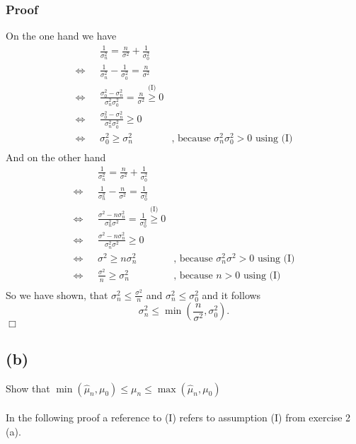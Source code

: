 \documentclass{article}
\begin{document}
\subsubsection*{Proof}
On the one hand we have
\begin{align*}
				   &\frac{1}{\sigma^2_n} = \frac{n}{\sigma^2} + \frac{1}{\sigma^2_0}&\\
\Leftrightarrow ~~~&\frac{1}{\sigma^2_n} - \frac{1}{\sigma^2_0} = \frac{n}{\sigma^2}&\\
\Leftrightarrow ~~~&\frac{\sigma^2_0 - \sigma^2_n}{\sigma^2_n\sigma^2_0} = \frac{n}{\sigma^2} \stackrel{\text{(I)}}{\geq} 0&\\
\Leftrightarrow ~~~&\frac{\sigma^2_0 - \sigma^2_n}{\sigma^2_n\sigma^2_0} \geq 0&\\
\Leftrightarrow ~~~&\sigma^2_0 \geq \sigma^2_n& \text{, because } \sigma^2_n\sigma^2_0 > 0 \text{ using (I)}\\
\end{align*}
And on the other hand
\begin{align*}
				   &\frac{1}{\sigma^2_n} = \frac{n}{\sigma^2} + \frac{1}{\sigma^2_0}&\\
\Leftrightarrow ~~~&\frac{1}{\sigma^2_n} - \frac{n}{\sigma^2} = \frac{1}{\sigma^2_0}&\\
\Leftrightarrow ~~~&\frac{\sigma^2 - n\sigma^2_n}{\sigma^2_n\sigma^2} = \frac{1}{\sigma^2_0} \stackrel{\text{(I)}}{\geq} 0&\\
\Leftrightarrow ~~~&\frac{\sigma^2 - n\sigma^2_n}{\sigma^2_n\sigma^2} \geq 0&\\
\Leftrightarrow ~~~&\sigma^2 \geq n\sigma^2_n& \text{, because } \sigma^2_n\sigma^2 > 0 \text{ using (I)}\\
\Leftrightarrow ~~~&\frac{\sigma^2}{n} \geq \sigma^2_n& \text{, because } n > 0 \text{ using (I)}~~~~~\\
\end{align*}
So we have shown, that $\sigma^2_n \leq \frac{\sigma^2}{n}$ and $\sigma^2_n \leq \sigma^2_0$ and it follows
$$
\sigma^2_n \leq \min \left (\frac{n}{\sigma^2},\sigma^2_0 \right ).
$$
\hspace*{\fill}$\Box$\\
\subsection*{(b)}
Show that $\min(\hat{\mu}_n,\mu_0) \leq \mu_n \leq \max(\hat{\mu}_n,\mu_0)$\\ \\
In the following proof a reference to (I) refers to assumption (I) from exercise 2 (a).\\
\end{document}
